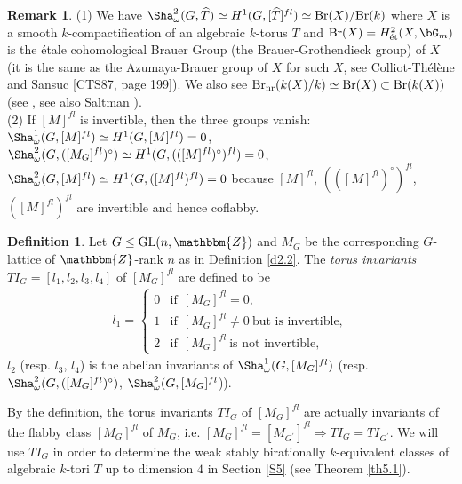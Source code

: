\documentclass{amsart}
\theoremstyle{plain}
\theoremstyle{definition}
\newtheorem{definition}[theorem]{Definition}
\newtheorem{remark}[theorem]{Remark}
\theoremstyle{remark}
\newcommand{\bZ}{\mathbbm{Z}}\newcommand{\bQ}{\mathbbm{Q}}
\newcommand{\GL}{{\rm GL}}\newcommand{\SL}{{\rm SL}}
\newcounter{sub}\def\tr{\mbox{tr }}
\begin{document}
\begin{remark}\label{r4.3}
(1) 
We have $\Sha^2_\omega(G,\widehat{T})\simeq 
H^1(G,[\widehat{T}]^{fl})\simeq {\rm Br}(X)/{\rm Br}(k)$ 
where $X$ is a smooth $k$-compactification of an algebraic $k$-torus $T$ 
and ${\rm Br}(X)=H^2_{\rm \acute{e}t}(X,\bG_m)$ is the \'etale cohomological Brauer Group (the Brauer-Grothendieck group) of $X$ 
(it is the same as the Azumaya-Brauer group of $X$ for such $X$, 
see Colliot-Th\'{e}l\`{e}ne and Sansuc [CTS87, page 199]). 
We also see  
${\rm Br}_{\rm nr}(k(X)/k)\simeq {\rm Br}(X)\subset {\rm Br}(k(X))$ 
(see \cite[Theorem 5.11]{CTS07}, 
see also Saltman \cite[Proposition 10.5]{Sal99}).\\
(2) If $[M]^{fl}$ is invertible, then the 
three groups vanish: $\Sha^1_\omega(G,[M]^{fl})\simeq H^1(G,[M]^{fl})=0$, 
$\Sha^2_\omega(G,([M_G]^{fl})^\circ)\simeq 
H^1(G,(([M]^{fl})^\circ)^{fl})=0$, 
$\Sha^2_\omega(G,[M]^{fl})\simeq H^1(G,([M]^{fl})^{fl})=0$ 
because $[M]^{fl}$, $(([M]^{fl})^\circ)^{fl}$, $([M]^{fl})^{fl}$ 
are invertible and hence coflabby. 
\end{remark}

\begin{definition}\label{defTI}
Let $G\leq \GL(n,\bZ)$ and 
$M_G$ be the corresponding $G$-lattice of $\bZ$-rank $n$ 
as in Definition \ref{d2.2}. 
The {\it torus invariants} $TI_G=[l_1,l_2,l_3,l_4]$ of $[M_G]^{fl}$ 
are defined to be 
\begin{align*}
l_1=
\begin{cases}
0& \textrm{if}\ \ [M_G]^{fl}=0,\\
1& \textrm{if}\ \ [M_G]^{fl}\neq 0\ \textrm{but\ is\ invertible},\\
2& \textrm{if}\ \ [M_G]^{fl}\ \textrm{is\ not\ invertible}, 
\end{cases}
\end{align*}
$l_2$ (resp. $l_3$, $l_4$) 
is the abelian invariants of 
$\Sha^1_\omega(G,[M_G]^{fl})$ 
(resp. $\Sha^2_\omega(G,([M_G]^{fl})^\circ)$, 
$\Sha^2_\omega(G,[M_G]^{fl}$)). 
\end{definition}

By the definition, 
the torus invariants $TI_G$ of $[M_G]^{fl}$ are actually 
invariants of the flabby class $[M_G]^{fl}$ of $M_G$, 
i.e. $[M_G]^{fl}=[M_{G^\prime}]^{fl}\Rightarrow TI_G=TI_{G^\prime}$. 
We will use $TI_G$ 
in order to determine 
the weak stably birationally $k$-equivalent classes 
of algebraic $k$-tori $T$ up to dimension $4$ in 
Section \ref{S5} (see Theorem \ref{th5.1}).\\
\end{document}
